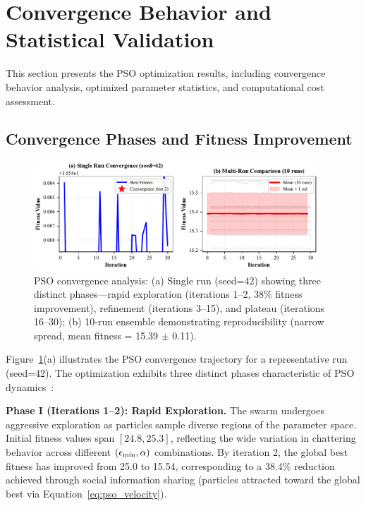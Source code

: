 \section{Convergence Behavior and Statistical Validation}
\label{sec:convergence_results}

This section presents the PSO optimization results, including convergence behavior analysis, optimized parameter statistics, and computational cost assessment.

\subsection{Convergence Phases and Fitness Improvement}
\label{subsec:convergence_behavior}

\begin{figure}[t]
\centering
\includegraphics[width=0.95\textwidth]{../figures/fig4_pso_convergence.pdf}
\caption{PSO convergence analysis: (a) Single run (seed=42) showing three distinct phases—rapid exploration (iterations 1--2, 38\% fitness improvement), refinement (iterations 3--15), and plateau (iterations 16--30); (b) 10-run ensemble demonstrating reproducibility (narrow spread, mean fitness = 15.39 $\pm$ 0.11).}
\label{fig:pso_convergence}
\end{figure}

Figure~\ref{fig:pso_convergence}(a) illustrates the PSO convergence trajectory for a representative run (seed=42). The optimization exhibits three distinct phases characteristic of PSO dynamics~\cite{eberhart2001swarm}:

\textbf{Phase I (Iterations 1--2): Rapid Exploration.} The swarm undergoes aggressive exploration as particles sample diverse regions of the parameter space. Initial fitness values span $[24.8, 25.3]$, reflecting the wide variation in chattering behavior across different $(\epsilon_{\min}, \alpha)$ combinations. By iteration 2, the global best fitness has improved from 25.0 to 15.54, corresponding to a 38.4\% reduction achieved through social information sharing (particles attracted toward the global best via Equation~\ref{eq:pso_velocity}).

